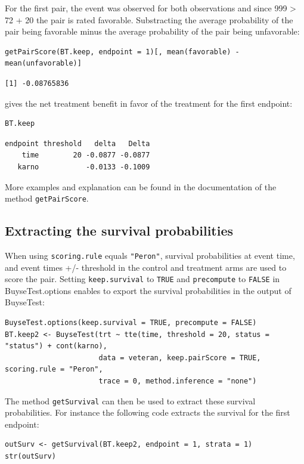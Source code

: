 \documentclass[12pt]{article}
\begin{document}
For the first pair, the event was observed for both observations and
since 999 > 72 + 20 the pair is rated favorable. Substracting the
average probability of the pair being favorable minus the average
probability of the pair being unfavorable:
\lstset{language=r,label= ,caption= ,captionpos=b,numbers=none}
\begin{lstlisting}
getPairScore(BT.keep, endpoint = 1)[, mean(favorable) - mean(unfavorable)]
\end{lstlisting}

\begin{verbatim}
[1] -0.08765836
\end{verbatim}


gives the net treatment benefit in favor of the treatment for the first
endpoint:
\lstset{language=r,label= ,caption= ,captionpos=b,numbers=none}
\begin{lstlisting}
BT.keep
\end{lstlisting}

\begin{verbatim}
endpoint threshold   delta   Delta
    time        20 -0.0877 -0.0877
   karno           -0.0133 -0.1009
\end{verbatim}


More examples and explanation can be found in the documentation of
the method \texttt{getPairScore}.

\subsection{Extracting the survival probabilities}
\label{sec:org9b0e386}
When using \texttt{scoring.rule} equals \texttt{"Peron"}, survival probabilities at
event time, and event times +/- threshold in the control and treatment
arms are used to score the pair. Setting \texttt{keep.survival} to \texttt{TRUE} and
\texttt{precompute} to \texttt{FALSE} in BuyseTest.options enables to export the
survival probabilities in the output of BuyseTest:
\lstset{language=r,label= ,caption= ,captionpos=b,numbers=none}
\begin{lstlisting}
BuyseTest.options(keep.survival = TRUE, precompute = FALSE)
BT.keep2 <- BuyseTest(trt ~ tte(time, threshold = 20, status = "status") + cont(karno),
                      data = veteran, keep.pairScore = TRUE, scoring.rule = "Peron",
                      trace = 0, method.inference = "none")
\end{lstlisting}

The method \texttt{getSurvival} can then be used to extract these survival
probabilities. For instance the following code extracts the survival
for the first endpoint:
\lstset{language=r,label= ,caption= ,captionpos=b,numbers=none}
\begin{lstlisting}
outSurv <- getSurvival(BT.keep2, endpoint = 1, strata = 1)
str(outSurv)
\end{lstlisting}
\end{document}
